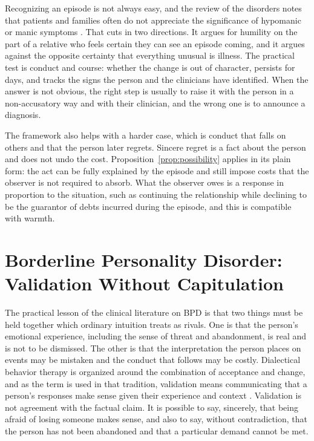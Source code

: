 \documentclass[11pt]{article}
\theoremstyle{definition}
\theoremstyle{remark}
\begin{document}
Recognizing an episode is not always easy, and the review of the disorders notes that patients and families often do not appreciate the significance of hypomanic or manic symptoms \citep{vieta2018}. That cuts in two directions. It argues for humility on the part of a relative who feels certain they can see an episode coming, and it argues against the opposite certainty that everything unusual is illness. The practical test is conduct and course: whether the change is out of character, persists for days, and tracks the signs the person and the clinicians have identified. When the answer is not obvious, the right step is usually to raise it with the person in a non-accusatory way and with their clinician, and the wrong one is to announce a diagnosis.

The framework also helps with a harder case, which is conduct that falls on others and that the person later regrets. Sincere regret is a fact about the person and does not undo the cost. Proposition~\ref{prop:possibility} applies in its plain form: the act can be fully explained by the episode and still impose costs that the observer is not required to absorb. What the observer owes is a response in proportion to the situation, such as continuing the relationship while declining to be the guarantor of debts incurred during the episode, and this is compatible with warmth.

\section{Borderline Personality Disorder: Validation Without Capitulation}\label{sec:bpd}

The practical lesson of the clinical literature on BPD is that two things must be held together which ordinary intuition treats as rivals. One is that the person's emotional experience, including the sense of threat and abandonment, is real and is not to be dismissed. The other is that the interpretation the person places on events may be mistaken and the conduct that follows may be costly. Dialectical behavior therapy is organized around the combination of acceptance and change, and as the term is used in that tradition, validation means communicating that a person's responses make sense given their experience and context \citep{linehan1993}. Validation is not agreement with the factual claim. It is possible to say, sincerely, that being afraid of losing someone makes sense, and also to say, without contradiction, that the person has not been abandoned and that a particular demand cannot be met.
\end{document}
